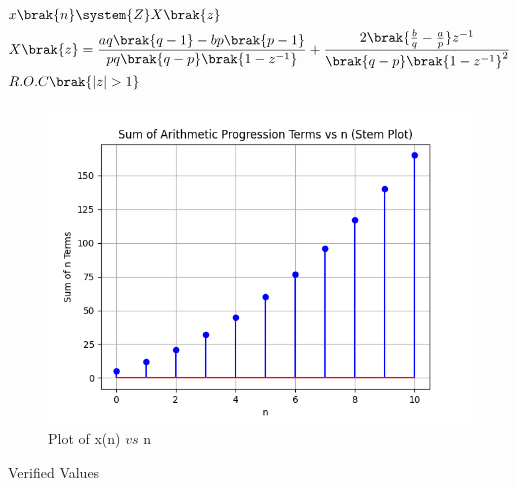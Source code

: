 \documentclass[journal,12pt,twocolumn]{IEEEtran}
\theoremstyle{remark}
\begin{document}
\begin{align}
    &x \brak{n} \system{Z} X \brak{z}\\
    &X\brak{z}=\frac{aq\brak{q-1}-bp\brak{p-1}}{pq\brak{q-p}\brak{1-z^{-1}}}+\frac{2\brak{\frac{b}{q}-\frac{a}{p}}z^{-1}}{\brak{q-p}\brak{1-z^{-1}}^{2}}\\
    &R.O.C\brak{|z|>1}
\end{align}
\begin{figure}[ht]
    \centering
    \includegraphics[width=\columnwidth]{ncert-maths/11/9/2/11/figs/Figure_1.png}
    \caption{Plot of x(n) $vs$ n}
    \label{fig:11.9.2.11.2}
\end{figure}
\begin{table}[ht]
    \centering
    \def\arraystretch{1.5}
    
    \caption{Verified Values}
    \label{tab:11.9.2.11.3}
\end{table}
\end{document}
